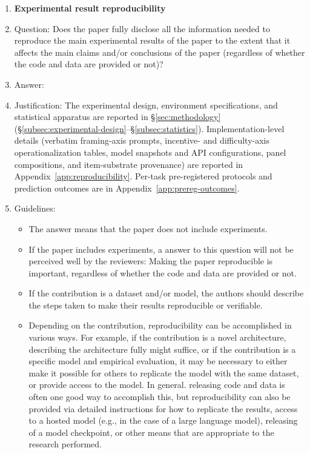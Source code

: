 \documentclass{article}
\begin{document}
\begin{enumerate}
    \item {\bf Experimental result reproducibility}
    \item[] Question: Does the paper fully disclose all the information needed to reproduce the main experimental results of the paper to the extent that it affects the main claims and/or conclusions of the paper (regardless of whether the code and data are provided or not)?
    \item[] Answer: \answerYes{} %
    \item[] Justification: The experimental design, environment specifications, and statistical apparatus are reported in \S\ref{sec:methodology} (\S\ref{subsec:experimental-design}--\S\ref{subsec:statistics}). Implementation-level details (verbatim framing-axis prompts, incentive- and difficulty-axis operationalization tables, model snapshots and API configurations, panel compositions, and item-substrate provenance) are reported in Appendix~\ref{app:reproducibility}. Per-task pre-registered protocols and prediction outcomes are in Appendix~\ref{app:prereg-outcomes}.
    \item[] Guidelines:
    \begin{itemize}
        \item The answer \answerNA{} means that the paper does not include experiments.
        \item If the paper includes experiments, a \answerNo{} answer to this question will not be perceived well by the reviewers: Making the paper reproducible is important, regardless of whether the code and data are provided or not.
        \item If the contribution is a dataset and\slash or model, the authors should describe the steps taken to make their results reproducible or verifiable. 
        \item Depending on the contribution, reproducibility can be accomplished in various ways. For example, if the contribution is a novel architecture, describing the architecture fully might suffice, or if the contribution is a specific model and empirical evaluation, it may be necessary to either make it possible for others to replicate the model with the same dataset, or provide access to the model. In general. releasing code and data is often one good way to accomplish this, but reproducibility can also be provided via detailed instructions for how to replicate the results, access to a hosted model (e.g., in the case of a large language model), releasing of a model checkpoint, or other means that are appropriate to the research performed.

\end{itemize}
\end{enumerate}
\end{document}
